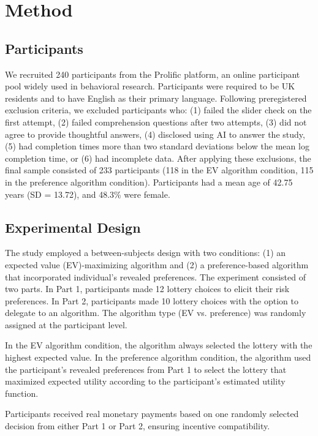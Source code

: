 \section{Method}

\subsection{Participants}

We recruited 240 participants from the Prolific platform, an online participant pool widely used in behavioral research. Participants were required to be UK residents and to have English as their primary language. Following preregistered exclusion criteria, we excluded participants who: (1) failed the slider check on the first attempt, (2) failed comprehension questions after two attempts, (3) did not agree to provide thoughtful answers, (4) disclosed using AI to answer the study, (5) had completion times more than two standard deviations below the mean log completion time, or (6) had incomplete data. After applying these exclusions, the final sample consisted of 233 participants (118 in the EV algorithm condition, 115 in the preference algorithm condition). Participants had a mean age of 42.75 years (SD = 13.72), and 48.3\% were female.

\subsection{Experimental Design}

The study employed a between-subjects design with two conditions: (1) an expected value (EV)-maximizing algorithm and (2) a preference-based algorithm that incorporated individual's revealed preferences. The experiment consisted of two parts. In Part 1, participants made 12 lottery choices to elicit their risk preferences. In Part 2, participants made 10 lottery choices with the option to delegate to an algorithm. The algorithm type (EV vs. preference) was randomly assigned at the participant level.

In the EV algorithm condition, the algorithm always selected the lottery with the highest expected value. In the preference algorithm condition, the algorithm used the participant's revealed preferences from Part 1 to select the lottery that maximized expected utility according to the participant's estimated utility function.

Participants received real monetary payments based on one randomly selected decision from either Part 1 or Part 2, ensuring incentive compatibility.

